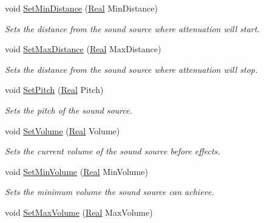 \begin{DoxyCompactItemize}
void \hyperlink{classphys_1_1Sound_ae32d4c4b8a09bfbdcfea68cfa71aa354}{SetMinDistance} (\hyperlink{namespacephys_af7eb897198d265b8e868f45240230d5f}{Real} MinDistance)
\begin{DoxyCompactList}\small\item\em Sets the distance from the sound source where attenuation will start. \item\end{DoxyCompactList}\item 
void \hyperlink{classphys_1_1Sound_a54d04549f0851b00736fdab18a81ec70}{SetMaxDistance} (\hyperlink{namespacephys_af7eb897198d265b8e868f45240230d5f}{Real} MaxDistance)
\begin{DoxyCompactList}\small\item\em Sets the distance from the sound source where attenuation will stop. \item\end{DoxyCompactList}\item 
void \hyperlink{classphys_1_1Sound_a4c7eac57c162f264d8c0868c4f360aab}{SetPitch} (\hyperlink{namespacephys_af7eb897198d265b8e868f45240230d5f}{Real} Pitch)
\begin{DoxyCompactList}\small\item\em Sets the pitch of the sound source. \item\end{DoxyCompactList}\item 
void \hyperlink{classphys_1_1Sound_a62438fb7916e1e7e9abe66722de83821}{SetVolume} (\hyperlink{namespacephys_af7eb897198d265b8e868f45240230d5f}{Real} Volume)
\begin{DoxyCompactList}\small\item\em Sets the current volume of the sound source before effects. \item\end{DoxyCompactList}\item 
void \hyperlink{classphys_1_1Sound_a76a487c8a455556ba4307c99cc41ea80}{SetMinVolume} (\hyperlink{namespacephys_af7eb897198d265b8e868f45240230d5f}{Real} MinVolume)
\begin{DoxyCompactList}\small\item\em Sets the minimum volume the sound source can achieve. \item\end{DoxyCompactList}\item 
void \hyperlink{classphys_1_1Sound_a04994399e336c8a0726c5da9f6349545}{SetMaxVolume} (\hyperlink{namespacephys_af7eb897198d265b8e868f45240230d5f}{Real} MaxVolume)

\end{DoxyCompactItemize}
